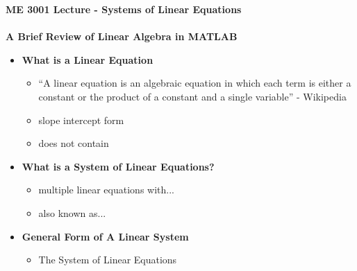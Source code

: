 \documentclass[11pt]{article}
\begin{document}
\textbf{ \LARGE ME 3001 Lecture - Systems of Linear Equations} \\\\
\textbf{ \LARGE A Brief Review of Linear Algebra in MATLAB} \\

\begin{itemize}

	\item  \textbf{\LARGE What is a Linear Equation}
		\LARGE
		\begin{itemize}
			\item ``A linear equation is an algebraic equation in which each term is either a constant or the product of a constant and a single variable'' - Wikipedia \\ \vspace{10mm}
			
			\item slope intercept form	\\\vspace{20mm}
			
			\item does not contain \\\vspace{20mm}
		\end{itemize}	

	\item \textbf{\LARGE What is a System of Linear Equations?}
		\begin{itemize}
			\item multiple linear equations with... \\\vspace{20mm}
			\item also known as... \\\vspace{20mm}				
		\end{itemize}

\newpage
\item \textbf{\LARGE General Form of  A Linear System}
	\begin{itemize}
		\item The System of Linear Equations \\ \\
		   \\
		   \\
		  \\
		  \\
		  \\		
		   \\\vspace{20mm}		
		  

\end{itemize}
\end{itemize}
\end{document}
